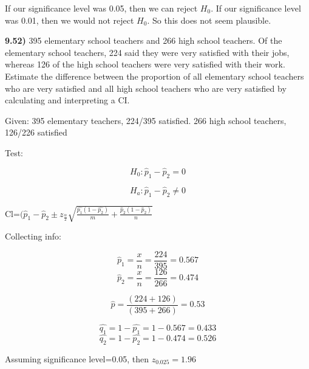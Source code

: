 \documentclass{article}
\begin{document}
If our significance level was 0.05, then we can reject $H_{0}$. If our significance level was 0.01, then we would not reject $H_{0}$. So this does not seem plausible.




\newpage

\textbf{9.52)} 395 elementary school teachers and 266 high school teachers. Of the elementary school teachers, 224 said they were very satisfied with their jobs, whereas 126 of the high school teachers were very satisfied with their work. Estimate the difference between the proportion of all elementary school teachers who are very satisfied and all high school teachers who are very satisfied by calculating and interpreting a CI.

\vspace{3mm}

Given: 395 elementary teachers, 224/395 satisfied. 266 high school teachers, 126/226 satisfied

\vspace{3mm}
Test:

$$H_{0}: \hat{p}_{1}-\hat{p}_{2}=0$$

$$H_{a}: \hat{p}_{1}-\hat{p}_{2} \ne 0$$





Cl=$(\hat{p}_{1}-\hat{p}_{2} \pm z_{\frac{\alpha}{2}}{\sqrt{\frac{\hat{p_{1}}(1-\hat{p_{2}})}{m}+\frac{\hat{p}_{2}(1-\hat{p}_{2})}{n}}}$



 Collecting info:
 
  \vspace{2mm}

 $$\hat{p}_{1}=\frac{x}{n}=\frac{224}{395}=0.567$$
 $$\hat{p}_{2}=\frac{x}{n}=\frac{126}{266}=0.474$$
 
 $$\hat{p}=\frac{(224+126)}{(395+266)}=0.53$$
 
 $$ \hat{q_{1}}=1-\hat{p_{1}}=1-0.567=0.433$$
 $$ \hat{q_{2}}=1-\hat{p_{2}}=1-0.474=0.526$$
 
  \vspace{2mm}
 
Assuming significance level=0.05, then $z_{0.025}=1.96$
\end{document}

